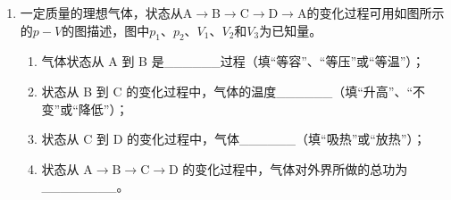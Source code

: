 \documentclass[\gkver]{gaokaozhenti}
\begin{document}
\begin{enumerate}
{（2）通过分析，可得电路图为

（3）设电路中的总电阻为 $R_{\text{总}}$，根据电路图可知 $R_{\text{总}}=R+\frac{1}{3}R=\frac{4}{3}R$。ab 两端电势差 $U_{ab}=E-IR=E-\frac{E}{R_{\text{总}}}R=\frac{1}{4}E=1.2\times10^{-2}\UV$。设 ab 离开磁场区域的时刻为 $t_{1}$，下一根金属条进入磁场区域的时刻为 $t_{2}$，则 $t_{1}=\frac{\theta}{\omega}=\frac{1}{12}\Us$，$t_{2}=\frac{\pi}{\omega}=\frac{1}{4}\Us$。设轮子转一圈的时间为 $T$，则 $T=\frac{2\pi}{\omega}=1\Us$。在 $T=1\Us$ 内，金属条有四次进出，后三次与第一次相同。可画出 $U_{ab}-t$ 图象如图所示。

（4）“闪烁”装置不能正常工作。（金属条的感应电动势只有 $4.9\times10^{-2}\UV$，远小于小灯泡的额定电压，因此无法工作。）

$B$ 增大，$E$ 增大，但有限度；

$r_{2}$ 增大，$E$ 增大，但有限度；

$\omega$ 增大，$E$ 增大，但有限度；

$\theta$ 增大，$E$ 不变。
}

\item
一定质量的理想气体，状态从A$\to$B$\to$C$\to$D$\to$A的变化过程可用如图所示的$p-V$的图描述，图中$p_{1}$、$p_{2}$、$V_{1}$、$V_{2}$和$V_{3}$为已知量。
\begin{enumerate}
	\item
	气体状态从 A 到 B 是\_\_\_\_\_\_过程（填“等容”、“等压”或“等温”）；
	\item
	状态从 B 到 C 的变化过程中，气体的温度\_\_\_\_\_\_（填“升高”、“不变”或“降低”）；
	\item
	状态从 C 到 D 的变化过程中，气体\_\_\_\_\_\_（填“吸热”或“放热”）；
	\item
	状态从 A$\to$B$\to$C$\to$D 的变化过程中，气体对外界所做的总功为\_\_\_\_\_\_\_\_。
\end{enumerate}
\end{enumerate}
\end{document}
